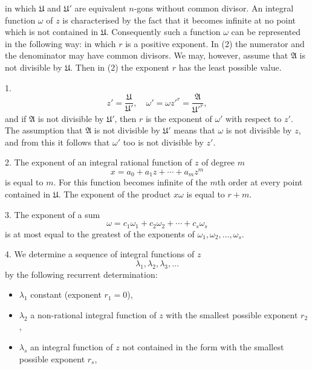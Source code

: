 in which $\mathfrak{U}$ and $\mathfrak{U}'$ are equivalent $n$-gons without common divisor. An integral function $\omega$ of $z$ is characterised by the fact that it becomes infinite at no point which is not contained in $\mathfrak{U}$. Consequently such a function $\omega$ can be represented in the following way:
in which $r$ is a positive exponent. In (2) the numerator and the denominator may have common divisors. We may, however, assume that $\mathfrak{A}$ is not divisible by $\mathfrak{U}$. Then in (2) the exponent $r$ has the least possible value. 

1. 
\[
z' = \frac{\mathfrak{U}}{\mathfrak{U}'}, \quad \omega' = \omega z'^r = \frac{\mathfrak{A}}{\mathfrak{U}'^r},
\]
and if $\mathfrak{A}$ is not divisible by $\mathfrak{U}'$, then $r$ is the exponent of $\omega'$ with respect to $z'$. The assumption that $\mathfrak{A}$ is not divisible by $\mathfrak{U}'$ means that $\omega$ is not divisible by $z$, and from this it follows that $\omega'$ too is not divisible by $z'$.

2. The exponent of an integral rational function of $z$ of degree $m$
\[
x = a_0 + a_1 z + \cdots + a_m z^m
\]
is equal to $m$. For this function becomes infinite of the $m$th order at every point contained in $\mathfrak{U}$. The exponent of the product $x\omega$ is equal to $r + m$.

3. The exponent of a sum
\[
\omega = c_1\omega_1 + c_2\omega_2 + \cdots + c_s\omega_s
\]
is at most equal to the greatest of the exponents of $\omega_1, \omega_2, \ldots, \omega_s$.

4. We determine a sequence of integral functions of $z$
\[
\lambda_1, \lambda_2, \lambda_3, \ldots
\]
by the following recurrent determination:
\begin{itemize}
\item[1)] $\lambda_1$ constant (exponent $r_1 = 0$),
\item[2)] $\lambda_2$ a non-rational integral function of $z$ with the smallest possible exponent $r_2$,
\item[3)] $\lambda_s$ an integral function of $z$ not contained in the form
with the smallest possible exponent $r_s$,
\end{itemize}
